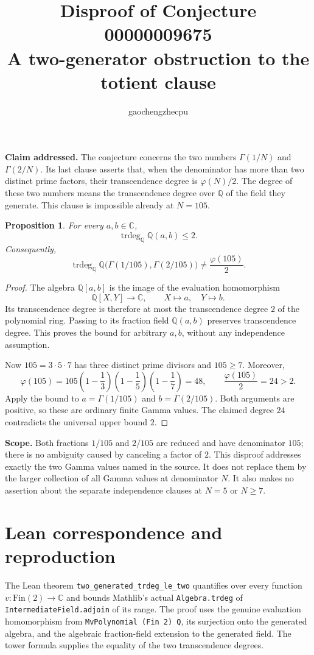 \documentclass[11pt]{article}
\title{Disproof of Conjecture 00000009675\\A two-generator obstruction to the totient clause}
\author{gaochengzhecpu}
\date{}
\newtheorem{proposition}{Proposition}
\begin{document}
\maketitle
\noindent\textbf{Claim addressed.} The conjecture concerns the two numbers $\Gamma(1/N)$ and $\Gamma(2/N)$. Its last clause asserts that, when the denominator has more than two distinct prime factors, their transcendence degree is $\varphi(N)/2$. The degree of these two numbers means the transcendence degree over $\mathbb Q$ of the field they generate. This clause is impossible already at $N=105$.

\begin{proposition}
For every $a,b\in\mathbb C$,
\[
 \operatorname{trdeg}_{\mathbb Q}\mathbb Q(a,b)\le2.
\]
Consequently,
\[
 \operatorname{trdeg}_{\mathbb Q}
 \mathbb Q\bigl(\Gamma(1/105),\Gamma(2/105)\bigr)
 \ne\frac{\varphi(105)}2.
\]
\end{proposition}
\begin{proof}
The algebra $\mathbb Q[a,b]$ is the image of the evaluation homomorphism
\[
 \mathbb Q[X,Y]\longrightarrow\mathbb C,\qquad X\mapsto a,\quad Y\mapsto b.
\]
Its transcendence degree is therefore at most the transcendence degree $2$ of the polynomial ring. Passing to its fraction field $\mathbb Q(a,b)$ preserves transcendence degree. This proves the bound for arbitrary $a,b$, without any independence assumption.

Now $105=3\cdot5\cdot7$ has three distinct prime divisors and $105\ge7$. Moreover,
\[
 \varphi(105)=105\left(1-\frac13\right)
 \left(1-\frac15\right)\left(1-\frac17\right)=48,
 \qquad \frac{\varphi(105)}2=24>2.
\]
Apply the bound to $a=\Gamma(1/105)$ and $b=\Gamma(2/105)$. Both arguments are positive, so these are ordinary finite Gamma values. The claimed degree $24$ contradicts the universal upper bound $2$.
\end{proof}

\noindent\textbf{Scope.} Both fractions $1/105$ and $2/105$ are reduced and have denominator $105$; there is no ambiguity caused by canceling a factor of $2$. This disproof addresses exactly the two Gamma values named in the source. It does not replace them by the larger collection of all Gamma values at denominator $N$. It also makes no assertion about the separate independence clauses at $N=5$ or $N\ge7$.

\section*{Lean correspondence and reproduction}
The Lean theorem \texttt{two\_generated\_trdeg\_le\_two} quantifies over every function $v:\mathrm{Fin}(2)\to\mathbb C$ and bounds Mathlib's actual \texttt{Algebra.trdeg} of \texttt{IntermediateField.adjoin} of its range. The proof uses the genuine evaluation homomorphism from \texttt{MvPolynomial (Fin 2) Q}, its surjection onto the generated algebra, and the algebraic fraction-field extension to the generated field. The tower formula supplies the equality of the two transcendence degrees.
\end{document}
